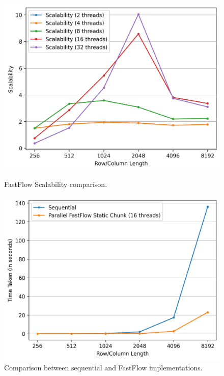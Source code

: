 \begin{figure}[h!]
    \begin{minipage}[t]{0.49\textwidth}
        \centering
        \includegraphics[width=\textwidth]{img/FastFlow/ff_scalability.png}
        \caption{FastFlow Scalability comparison.}
        \label{FF_Scalability}
    \end{minipage}
    \hfill
    \begin{minipage}[t]{0.49\textwidth}
        \centering
        \includegraphics[width=\textwidth]{img/FastFlow/ff_sequential_vs_fastflow.png}
        \caption{Comparison between sequential and FastFlow implementations.}
        \label{FF_Sequential_vs_FastFlow}
    \end{minipage}
\end{figure}